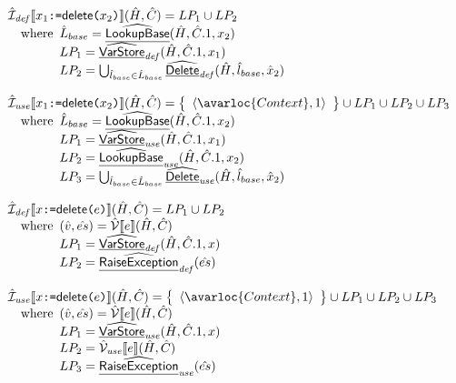\[
\begin{array}{l}
  \\\\
  \aI_{\it def}\lbr x_1 \TT{:=} \SF{delete}\TT{(}x_2\TT{)} \rbr(\hat{H},\hat{C})
  = LP_1\cup LP_2\\
  \quad\wherec{
    \hat{L}_{base}=\ahf{LookupBase}(\hat{H},\hat{C}.1,x_2)\\
    LP_1 = \ahf{VarStore}_{\it def}(\hat{H}, \hat{C}.1, x_1)\\
    LP_2 = \bigcup_{\hat{l}_{base}\in\hat{L}_{base}}\ahf{Delete}_{\it def}(\hat{H},\hat{l}_{base},\hat{x}_2)\\
  }
  \\\\
  \aI_{\it use}\lbr x_1 \TT{:=} \SF{delete}\TT{(}x_2\TT{)} \rbr(\hat{H},\hat{C})
  = \set{\langle \avarloc{Context}, 1\rangle} \cup LP_1 \cup LP_2\cup LP_3\\
  \quad\wherec{
    \hat{L}_{base}=\ahf{LookupBase}(\hat{H},\hat{C}.1,x_2)\\
    LP_1 = \ahf{VarStore}_{\it use}(\hat{H}, \hat{C}.1, x_1)\\
    LP_2 = \ahf{LookupBase}_{\it use}(\hat{H}, \hat{C}.1, x_2)\\
    LP_3 = \bigcup_{\hat{l}_{base}\in\hat{L}_{base}}\ahf{Delete}_{\it use}(\hat{H},\hat{l}_{base},\hat{x}_2)\\
  }
  \\\\
  \aI_{\it def}\lbr x \TT{:=} \SF{delete}\TT{(}e\TT{)} \rbr(\hat{H},\hat{C})
  = LP_1 \cup LP_2\\
  \quad\wherec{
    (\hat{v},\hat{es}) = \aV\lbr e\rbr(\hat{H},\hat{C})\\
    LP_1 = \ahf{VarStore}_{\it def}(\hat{H}, \hat{C}.1, x)\\
    LP_2 = \ahf{RaiseException}_{\it def}(\hat{es})
  }
  \\\\
  \aI_{\it use}\lbr x \TT{:=} \SF{delete}\TT{(}e\TT{)} \rbr(\hat{H},\hat{C})
  = \set{\langle \avarloc{Context}, 1\rangle} \cup LP_1 \cup LP_2 \cup LP_3\\
  \quad\wherec{
    (\hat{v},\hat{es}) = \aV\lbr e\rbr(\hat{H},\hat{C})\\
    LP_1 = \ahf{VarStore}_{\it use}(\hat{H}, \hat{C}.1, x)\\
    LP_2 = \aV_{\it use}\lbr e\rbr(\hat{H},\hat{C})\\
    LP_3 = \ahf{RaiseException}_{\it use}(\hat{es})
  }
  \\\\

\end{array}\]
